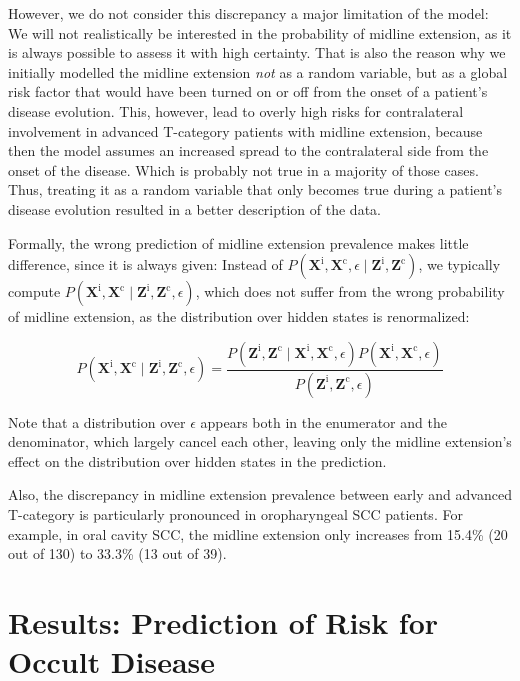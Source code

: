 \documentclass[
  sn-mathphys-num,
]{sn-jnl}
\begin{document}
However, we do not consider this discrepancy a major limitation of the
model: We will not realistically be interested in the probability of
midline extension, as it is always possible to assess it with high
certainty. That is also the reason why we initially modelled the midline
extension \emph{not} as a random variable, but as a global risk factor
that would have been turned on or off from the onset of a patient's
disease evolution. This, however, lead to overly high risks for
contralateral involvement in advanced T-category patients with midline
extension, because then the model assumes an increased spread to the
contralateral side from the onset of the disease. Which is probably not
true in a majority of those cases. Thus, treating it as a random
variable that only becomes true during a patient's disease evolution
resulted in a better description of the data.

Formally, the wrong prediction of midline extension prevalence makes
little difference, since it is always given: Instead of
\(P\left( \mathbf{X}^\text{i}, \mathbf{X}^\text{c}, \epsilon \mid \mathbf{Z}^\text{i}, \mathbf{Z}^\text{c} \right)\),
we typically compute
\(P\left( \mathbf{X}^\text{i}, \mathbf{X}^\text{c} \mid \mathbf{Z}^\text{i}, \mathbf{Z}^\text{c}, \epsilon \right)\),
which does not suffer from the wrong probability of midline extension,
as the distribution over hidden states is renormalized:

\[
P \left( \mathbf{X}^\text{i}, \mathbf{X}^\text{c} \mid \mathbf{Z}^\text{i}, \mathbf{Z}^\text{c}, \epsilon \right) = \frac{P \left( \mathbf{Z}^\text{i}, \mathbf{Z}^\text{c} \mid \mathbf{X}^\text{i}, \mathbf{X}^\text{c}, \epsilon \right) P \left( \mathbf{X}^\text{i}, \mathbf{X}^\text{c}, \epsilon \right)}{P \left( \mathbf{Z}^\text{i}, \mathbf{Z}^\text{c}, \epsilon \right)}
\]

Note that a distribution over \(\epsilon\) appears both in the
enumerator and the denominator, which largely cancel each other, leaving
only the midline extension's effect on the distribution over hidden
states in the prediction.

Also, the discrepancy in midline extension prevalence between early and
advanced T-category is particularly pronounced in oropharyngeal SCC
patients. For example, in oral cavity SCC, the midline extension only
increases from 15.4\% (20 out of 130) to 33.3\% (13 out of 39).

\section{Results: Prediction of Risk for Occult
Disease}\label{results-prediction-of-risk-for-occult-disease}
\end{document}
